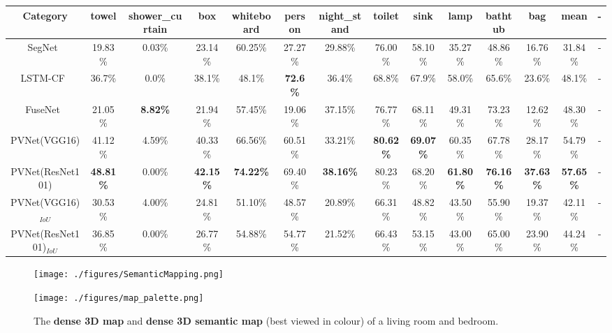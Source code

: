 \documentclass[letterpaper, 10 pt, conference]{ieeeconf}
\begin{document}
\begin{table*}[thpb]
{\begin{tabular}{ c | c  c  c  c  c  c  c  c  c  c  c  c  c}
Category                               & towel & shower\_curtain & box & whiteboard & person & night\_stand & toilet & sink & lamp & bathtub & bag & mean & - \\
\midrule
SegNet~\cite{badrinarayanan2015segnet}  & 19.83\% & 0.03\% & 23.14\% & 60.25\% & 27.27\% & 29.88\% & 76.00\% & 58.10\% & 35.27\% & 48.86\% & 16.76\% & 31.84\% & - \\
LSTM-CF~\cite{li2016lstm}                  & 36.7\%  & 0.0\%  & 38.1\%  & 48.1\%  & \textbf{72.6\%}  & 36.4\%  & 68.8\%  & 67.9\%  & 58.0\%  & 65.6\%  & 23.6\%  & 48.1\%  & - \\
FuseNet~\cite{hazirbas2016fusenet}      & 21.05\% & \textbf{8.82\%} & 21.94\% & 57.45\% & 19.06\% & 37.15\% & 76.77\% & 68.11\% & 49.31\% & 73.23\% & 12.62\% & 48.30\% & - \\
PVNet(VGG16)                           & 41.12\% & 4.59\% & 40.33\% & 66.56\% & 60.51\% & 33.21\% & \textbf{80.62\%} & \textbf{69.07\%} & 60.35\% & 67.78\% & 28.17\% & 54.79\% & - \\
PVNet(ResNet101)                       & \textbf{48.81\%} & 0.00\% & \textbf{42.15\%} & \textbf{74.22\%} & 69.40\% & \textbf{38.16\%} & 80.23\% & 68.20\% & \textbf{61.80\%} & \textbf{76.16\%} & \textbf{37.63\%} & \textbf{57.65\%} & - \\
\midrule
PVNet(VGG16)$_{IoU}$                   & 30.53\% & 4.00\% & 24.81\% & 51.10\% & 48.57\% & 20.89\% & 66.31\% & 48.82\% & 43.50\% & 55.90\% & 19.37\% & 42.11\% & - \\
PVNet(ResNet101)$_{IoU}$               & 36.85\% & 0.00\% & 26.77\% & 54.88\% & 54.77\% & 21.52\% & 66.43\% & 53.15\% & 43.00\% & 65.00\% & 23.90\% & 44.24\% & - \\
\bottomrule
\end{tabular}}
\label{table:The comparison class-wise accuracy on the SUN RGB-D dataset.}
\end{table*}


\begin{figure*}[thpb]
\centering
\label{fig:PointCloud}{\texttt{[image: ./figures/SemanticMapping.png]}}

\label{fig:map_palette}{\texttt{[image: ./figures/map\_palette.png]}}
\caption{The \textbf{dense 3D map} and \textbf{dense 3D semantic map} (best viewed in colour) of a living room and bedroom.}
\label{fig:semantic mapping}
\end{figure*}
\end{document}
